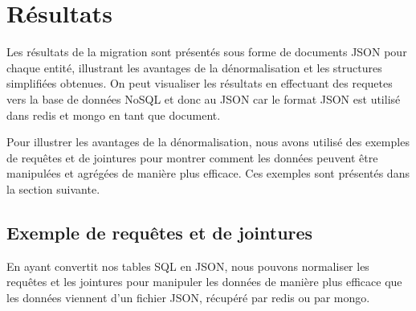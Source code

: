 \chapter{Résultats}
Les résultats de la migration sont présentés sous forme de documents JSON pour chaque entité, illustrant les avantages de la dénormalisation et les structures simplifiées obtenues. On peut visualiser les résultats en effectuant des requetes vers la base de données NoSQL et donc au JSON car le format JSON est utilisé dans redis et mongo en tant que document.

Pour illustrer les avantages de la dénormalisation, nous avons utilisé des exemples de requêtes et de jointures pour montrer comment les données peuvent être manipulées et agrégées de manière plus efficace. Ces exemples sont présentés dans la section suivante.

\section{Exemple de requêtes et de jointures}

En ayant convertit nos tables SQL en JSON, nous pouvons normaliser les requêtes et les jointures pour manipuler les données de manière plus efficace que les données viennent d'un fichier JSON, récupéré par redis ou par mongo.

